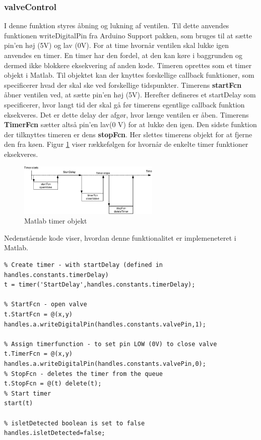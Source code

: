 \subsubsection{valveControl}
I denne funktion styres åbning og lukning af ventilen. Til dette anvendes funktionen writeDigitalPin fra Arduino Support pakken, som bruges til at sætte pin'en høj (5V) og lav (0V). For at time hvornår ventilen skal lukke igen anvendes en timer. En timer har den fordel, at den kan køre i baggrunden og dermed ikke blokkere eksekvering af anden kode. Timeren oprettes som et timer objekt i Matlab. Til objektet kan der knyttes forskellige callback funktioner, som specificerer hvad der skal ske ved forskellige tidspunkter. Timerens \textbf{startFcn} åbner ventilen ved, at sætte pin'en høj (5V). Herefter defineres et startDelay som specificerer, hvor langt tid der skal gå før timerens egentlige callback funktion eksekveres. Det er dette delay der afgør, hvor længe ventilen er åben. Timerens \textbf{TimerFcn} sætter altså pin'en lav(0 V) for at lukke den igen. Den sidste funktion der tilknyttes timeren er dens \textbf{stopFcn}. Her slettes timerens objekt for at fjerne den fra køen. Figur \ref{fig:timer} viser rækkefølgen for hvornår de enkelte timer funktioner eksekveres. 
\begin{figure}[H]
	\centering
	\includegraphics[width=0.6\textwidth]{billeder/software/timer-crop.pdf}
	\caption{Matlab timer objekt}
	\label{fig:timer}
\end{figure}
Nedenstående kode viser, hvordan denne funktionalitet er implemeneteret i Matlab.  
\begin{lstlisting} 
% Create timer - with startDelay (defined in handles.constants.timerDelay)
t = timer('StartDelay',handles.constants.timerDelay);

% StartFcn - open valve
t.StartFcn = @(x,y) handles.a.writeDigitalPin(handles.constants.valvePin,1);

% Assign timerfunction - to set pin LOW (0V) to close valve
t.TimerFcn = @(x,y) handles.a.writeDigitalPin(handles.constants.valvePin,0);
% StopFcn - deletes the timer from the queue 
t.StopFcn = @(t) delete(t);
% Start timer
start(t)

% isletDetected boolean is set to false
handles.isletDetected=false;
\end{lstlisting} 

